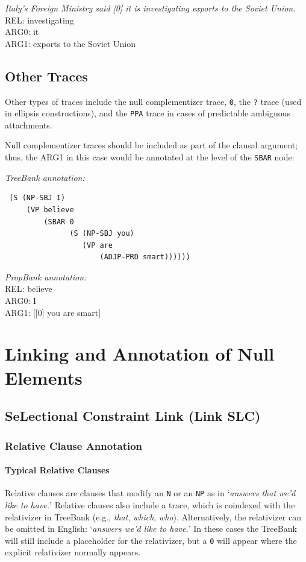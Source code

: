 \documentclass[11pt]{report}
\begin{document}
\textit{Italy's Foreign Ministry said [0] it is investigating exports to the Soviet Union.}\\
REL: investigating\\
ARG0: it\\
ARG1: exports to the Soviet Union

\subsection{Other Traces}

Other types of traces include the null complementizer trace, \texttt{0}, the \texttt{?} trace (used in ellipsis constructions), and the \texttt{PPA} trace in cases of predictable ambiguous attachments. 

Null complementizer traces should be included as part of the clausal argument; thus, the ARG1 in this case would be annotated at the level of the \texttt{SBAR} node:

\textit{TreeBank annotation:}
 \begin{verbatim}
 (S (NP-SBJ I)
     (VP believe
         (SBAR 0
               (S (NP-SBJ you)
                  (VP are
                      (ADJP-PRD smart))))))
\end{verbatim}
 
\textit{PropBank annotation:}\\
REL: believe\\
ARG0: I\\
ARG1: [[0] you are smart]

\section{Linking and Annotation of Null Elements}
\label{sec: null2}
\subsection{SeLectional Constraint Link (Link SLC)}
\label{ssec: SLC}
\subsubsection{Relative Clause Annotation}

\paragraph{Typical Relative Clauses}
Relative clauses are clauses that modify an \texttt{N} or an \texttt{NP} as in `\textit{answers that we'd like to have.}'  Relative clauses also include a trace, which is coindexed with the relativizer in TreeBank (e.g., \textit{that}, \textit{which}, \textit{who}).  Alternatively, the relativizer can be omitted in English: `\textit{answers we'd like to have.}'  In these cases the TreeBank will still include a placeholder for the relativizer, but a \texttt{0} will appear where the explicit relativizer normally appears.
\end{document}
